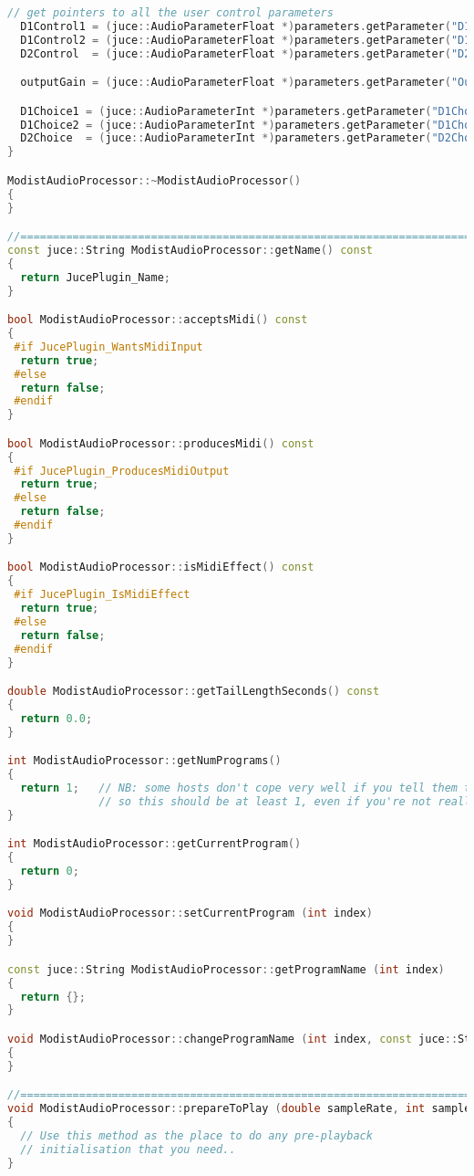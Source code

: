 \documentclass{article}
\begin{document}
\begin{appendix}
\begin{lstlisting}[language=C++]
  // get pointers to all the user control parameters
  D1Control1 = (juce::AudioParameterFloat *)parameters.getParameter("D1Control1");
  D1Control2 = (juce::AudioParameterFloat *)parameters.getParameter("D1Control2");
  D2Control  = (juce::AudioParameterFloat *)parameters.getParameter("D2Control");

  outputGain = (juce::AudioParameterFloat *)parameters.getParameter("OutputGain");

  D1Choice1 = (juce::AudioParameterInt *)parameters.getParameter("D1Choice1");
  D1Choice2 = (juce::AudioParameterInt *)parameters.getParameter("D1Choice2");
  D2Choice  = (juce::AudioParameterInt *)parameters.getParameter("D2Choice");
}

ModistAudioProcessor::~ModistAudioProcessor()
{
}

//==============================================================================
const juce::String ModistAudioProcessor::getName() const
{
  return JucePlugin_Name;
}

bool ModistAudioProcessor::acceptsMidi() const
{
 #if JucePlugin_WantsMidiInput
  return true;
 #else
  return false;
 #endif
}

bool ModistAudioProcessor::producesMidi() const
{
 #if JucePlugin_ProducesMidiOutput
  return true;
 #else
  return false;
 #endif
}

bool ModistAudioProcessor::isMidiEffect() const
{
 #if JucePlugin_IsMidiEffect
  return true;
 #else
  return false;
 #endif
}

double ModistAudioProcessor::getTailLengthSeconds() const
{
  return 0.0;
}

int ModistAudioProcessor::getNumPrograms()
{
  return 1;   // NB: some hosts don't cope very well if you tell them there are 0 programs,
              // so this should be at least 1, even if you're not really implementing programs.
}

int ModistAudioProcessor::getCurrentProgram()
{
  return 0;
}

void ModistAudioProcessor::setCurrentProgram (int index)
{
}

const juce::String ModistAudioProcessor::getProgramName (int index)
{
  return {};
}

void ModistAudioProcessor::changeProgramName (int index, const juce::String& newName)
{
}

//==============================================================================
void ModistAudioProcessor::prepareToPlay (double sampleRate, int samplesPerBlock)
{
  // Use this method as the place to do any pre-playback
  // initialisation that you need..
}


\end{lstlisting}
\end{appendix}
\end{document}
